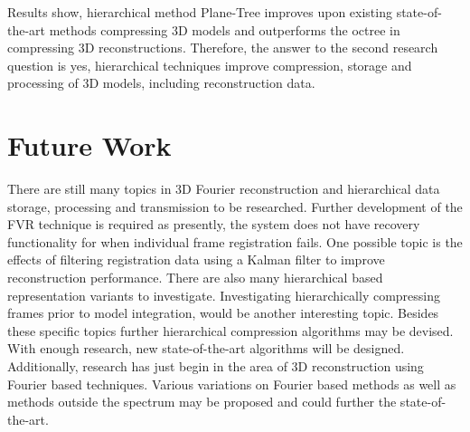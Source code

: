 Results show, hierarchical method Plane-Tree improves upon existing state-of-the-art methods compressing 3D models and outperforms the octree in compressing 3D reconstructions. Therefore, the answer to the second research question is yes, hierarchical techniques improve compression, storage and processing of 3D models, including reconstruction data. \\

\section{Future Work}

There are still many topics in 3D Fourier reconstruction and hierarchical data storage, processing and transmission to be researched. Further development of the FVR technique is required as presently, the system does not have recovery functionality for when individual frame registration fails. One possible topic is the effects of filtering registration data using a Kalman filter to improve reconstruction performance. There are also many hierarchical based representation variants to investigate. Investigating hierarchically compressing frames prior to model integration, would be another interesting topic. Besides these specific topics further hierarchical compression algorithms may be devised. With enough research, new state-of-the-art algorithms will be designed. Additionally, research has just begin in the area of 3D reconstruction using Fourier based techniques. Various variations on Fourier based methods as well as methods outside the spectrum may be proposed and could further the state-of-the-art. \\
